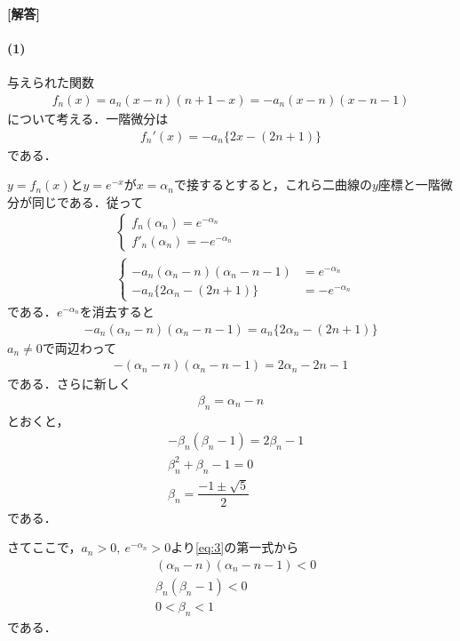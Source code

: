 \documentclass[../../main.tex]{subfiles}
\begin{document}
\begin{oframed}
  
\end{oframed}

{\bf [解答]}
\paragraph{(1)}
与えられた関数
\begin{align}
  f_n(x)=a_n(x-n)(n+1-x)=-a_n(x-n)(x-n-1) \label{eq:1}
\end{align}
について考える．一階微分は
\begin{align}
  f_n'(x)=-a_n\{2x-(2n+1)\} \label{eq:2}
\end{align}
である．

$y=f_n(x)$と$y=e^{-x}$が$x=\alpha_n$で接するとすると，これら二曲線の$y$座標と一階微分が同じである．従って
\begin{align}
  &
  \begin{cases}
    f_n(\alpha_n) = e^{-\alpha_n} \\
    f'_n(\alpha_n) = -e^{-\alpha_n}
  \end{cases} \\
  &
  \begin{cases}\\
    -a_n(\alpha_n-n)(\alpha_n-n-1)&=e^{-\alpha_n} \\
    -a_n\{2\alpha_n-(2n+1)\}&=-e^{-\alpha_n}
  \end{cases} \label{eq:3}
\end{align}
である．$e^{-\alpha_n}$を消去すると
\begin{align}
  -a_n(\alpha_n-n)(\alpha_n-n-1) = a_n\{2\alpha_n-(2n+1)\}
\end{align}
$a_n\neq 0$で両辺わって
\begin{align}
  -(\alpha_n-n)(\alpha_n-n-1)=2\alpha_n-2n-1
\end{align}
である．さらに新しく
\begin{align}
  \beta_n = \alpha_n-n \label{eq:4}
\end{align}
とおくと，
\begin{align}
  &-\beta_n(\beta_n-1)=2\beta_n-1 \\
  & \beta_n^2+\beta_n-1=0 \\
  & \beta_n=\dfrac{-1\pm\sqrt{5}}{2} \label{eq:5}
\end{align}
である．

さてここで，$a_n>0,\ e^{-\alpha_n}>0$より\cref{eq:3}の第一式から
\begin{align}
  &(\alpha_n-n)(\alpha_n-n-1)<0 \\
  &\beta_n(\beta_n-1)<0 \\
  &0<\beta_n<1
\end{align}
である．
\end{document}
